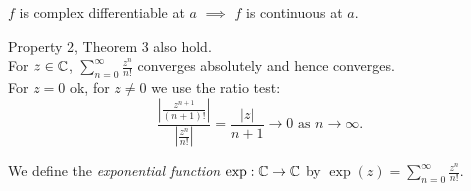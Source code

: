 \documentclass[a4paper]{article}
\begin{document}
\begin{prop}
$f$ is complex differentiable at $a$ $\implies$ $f$ is continuous at $a$.
\end{prop}
Property 2, Theorem 3 also hold.\\

For $z\in\mathbb{C}$, $\sum_{n=0}^\infty \frac{z^n}{n!}$ converges absolutely and hence converges.\\
For $z=0$ ok, for $z\neq 0$ we use the ratio test:
\begin{equation*}
\frac{|\frac{z^{n+1}}{\left(n+1\right)!}|}{|\frac{z^n}{n!}|}=\frac{|z|}{n+1}\to 0 \text{ as } n\to \infty.
\end{equation*}

We define the \emph{exponential function} $\exp :\mathbb{C}\to\mathbb{C}$ by $\exp\left(z\right)=\sum_{n=0}^\infty \frac{z^n}{n!}$.\\
\end{document}
